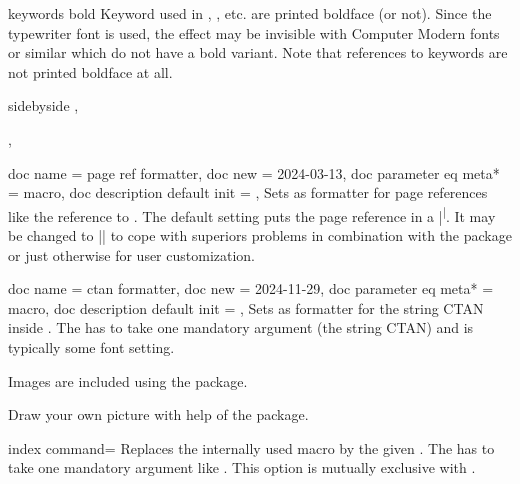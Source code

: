 \begin{docTcbKey}[][doc new=2017-04-25]{keywords bold}{}{}
  Keyword used in , , etc. are printed
  boldface (or not). Since the typewriter font is used, the effect may be
  invisible with Computer Modern fonts or similar which do not
  have a bold variant. Note that references to keywords are not printed boldface at all.
\begin{dispExample*}{sidebyside}
\LARGE
{}, 

, 
\end{dispExample*}
\end{docTcbKey}


\begin{docTcbKeys}
  {
    {
      doc name               = page ref formatter,
      doc new                = {2024-03-13},
      doc parameter eq meta* = macro,
      doc description default init = {}{},
    }
  }
Sets  as formatter for page references like the
reference to .
The default setting puts the page reference in a |\textsuperscript|.
It may be changed to |\fakesuperscript| to cope with superiors problems
in combination with the  package or just otherwise for user customization.
\end{docTcbKeys}


\begin{docTcbKeys}
  {
    {
      doc name               = ctan formatter,
      doc new                = {2024-11-29},
      doc parameter eq meta* = macro,
      doc description default init = {}{},
    }
  }
Sets  as formatter for the string CTAN inside .
The  has to take one mandatory argument (the string CTAN) and
is typically some font setting.
\begin{dispExample}
Images are included using the  package.\par
\newcommand{\myformatter}[1]{\textbf{\ttfamily\color{red}\TeX-Archive}}
Draw your own picture with help of the  package.
\end{dispExample}
\end{docTcbKeys}



\begin{docTcbKey}[][doc new=2015-01-09]{index command}{=}{}
  Replaces the internally used  macro by the given .
  The  has to take one mandatory argument like .
  This option is mutually exclusive with .
\begin{dispListing}
\end{dispListing}
\end{docTcbKey}


